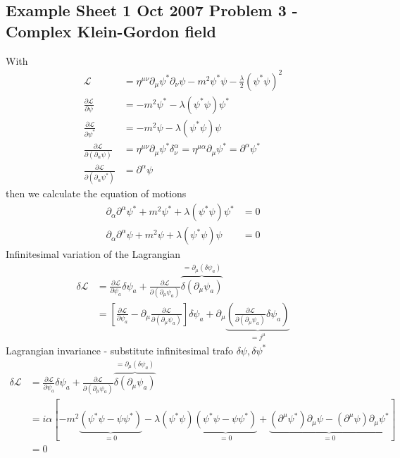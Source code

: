 \documentclass[../main.tex]{subfiles}
\begin{document}
\subsection{Example Sheet 1 Oct 2007 Problem 3 - Complex Klein-Gordon field}
With
\begin{align}
\mathcal{L}
&=\eta^{\mu\nu}\partial_\mu\psi^*\partial_\nu\psi-m^2\psi^*\psi-\frac{\lambda}{2}(\psi^*\psi)^2\\
\frac{\partial \mathcal{L}}{\partial\psi}
&=-m^2\psi^*-\lambda(\psi^*\psi)\psi^*\\
\frac{\partial \mathcal{L}}{\partial\psi^*}
&=-m^2\psi-\lambda(\psi^*\psi)\psi\\
\frac{\partial \mathcal{L}}{\partial(\partial_\alpha\psi)}
&=\eta^{\mu\nu}\partial_\mu\psi^*\delta^\alpha_\nu
=\eta^{\mu\alpha}\partial_\mu\psi^*
=\partial^\alpha\psi^*\\
\frac{\partial \mathcal{L}}{\partial(\partial_\alpha\psi^*)}
&=\partial^\alpha\psi
\end{align}
then we calculate the equation of motions
\begin{align}
\partial_\alpha\partial^\alpha\psi^*+m^2\psi^*+\lambda(\psi^*\psi)\psi^*&=0\\
\partial_\alpha\partial^\alpha\psi+m^2\psi+\lambda(\psi^*\psi)\psi&=0
\end{align}
Infinitesimal variation of the Lagrangian
\begin{align}
\delta\mathcal{L}
&=\frac{\partial\mathcal{L}}{\partial\psi_a}\delta\psi_a+\frac{\partial\mathcal{L}}{\partial(\partial_\mu\psi_a)}\overbrace{\delta(\partial_\mu\psi_a)}^{=\partial_\mu(\delta\psi_a)}\\
&=\left[\frac{\partial\mathcal{L}}{\partial\psi_a}-\partial_\mu\frac{\partial\mathcal{L}}{\partial(\partial_\mu\psi_a)}\right]\delta\psi_a+\partial_\mu\underbrace{\left(\frac{\partial\mathcal{L}}{\partial(\partial_\mu\psi_a)}\delta\psi_a\right)}_{=j^\mu}
\end{align}
Lagrangian invariance - substitute infinitesimal trafo $\delta\psi, \delta\psi^*$
\begin{align}
\delta\mathcal{L}
&=\frac{\partial\mathcal{L}}{\partial\psi_a}\delta\psi_a+\frac{\partial\mathcal{L}}{\partial(\partial_\mu\psi_a)}\overbrace{\delta(\partial_\mu\psi_a)}^{=\partial_\mu(\delta\psi_a)}\\
&=i\alpha\left[-m^2\underbrace{(\psi^*\psi-\psi\psi^*)}_{=0}-\lambda(\psi^*\psi)\underbrace{(\psi^*\psi-\psi\psi^*)}_{=0}+\underbrace{(\partial^\mu\psi^*)\partial_\mu\psi-(\partial^\mu\psi)\partial_\mu\psi^*}_{=0}\right]\\
&=0
\end{align}
\end{document}
